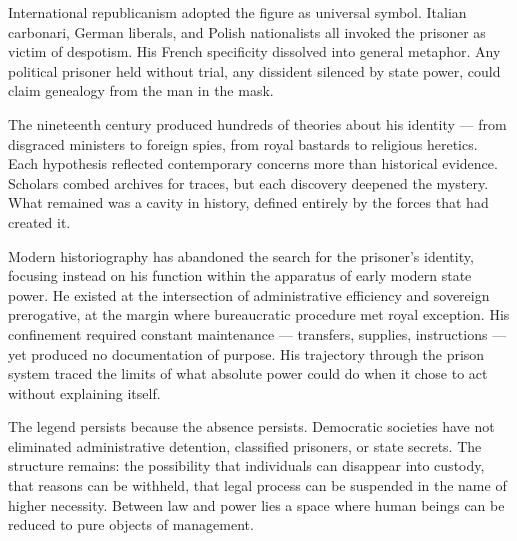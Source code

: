 International republicanism adopted the figure as universal symbol. Italian carbonari, German liberals, and Polish nationalists all invoked the prisoner as victim of despotism. His French specificity dissolved into general metaphor. Any political prisoner held without trial, any dissident silenced by state power, could claim genealogy from the man in the mask.

The nineteenth century produced hundreds of theories about his identity — from disgraced ministers to foreign spies, from royal bastards to religious heretics. Each hypothesis reflected contemporary concerns more than historical evidence. Scholars combed archives for traces, but each discovery deepened the mystery. What remained was a cavity in history, defined entirely by the forces that had created it.

Modern historiography has abandoned the search for the prisoner's identity, focusing instead on his function within the apparatus of early modern state power. He existed at the intersection of administrative efficiency and sovereign prerogative, at the margin where bureaucratic procedure met royal exception. His confinement required constant maintenance — transfers, supplies, instructions — yet produced no documentation of purpose. His trajectory through the prison system traced the limits of what absolute power could do when it chose to act without explaining itself.

The legend persists because the absence persists. Democratic societies have not eliminated administrative detention, classified prisoners, or state secrets. The structure remains: the possibility that individuals can disappear into custody, that reasons can be withheld, that legal process can be suspended in the name of higher necessity. Between law and power lies a space where human beings can be reduced to pure objects of management.

